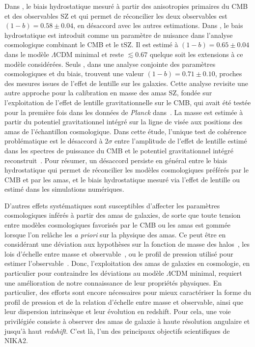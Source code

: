 Dans \citet{Planck_2016_SZ_cosmo}, le biais hydrostatique mesuré à partir
des anisotropies primaires du CMB et des observables SZ et qui permet
de réconcilier les deux observables est $(1-b) = 0.58 \pm 0.04$, en
désaccord avec les autres estimations. Dans \citet{Salvati2018}, le
bais hydrostatique est introduit comme un paramètre de nuisance dans
l'analyse cosmologique combinant le CMB et le tSZ. Il est estimé à
$(1-b) = 0.65 \pm 0.04$ dans le modèle $\Lambda$CDM minimal et reste
$\lesssim 0.67$ quelque soit les extensions à ce modèle considérées.
Seuls \citet{Zulbedia2019}, dans une analyse conjointe des paramètres
cosmologiques et du biais, trouvent une valeur
$(1-b) = 0.71 \pm 0.10$, proches des mesures issues de l'effet de
lentille sur les galaxies. Cette analyse revisite une autre approche
pour la calibration en masse des amas SZ, fondée sur l'exploitation de
l'effet de lentille gravitationnelle sur le CMB, qui avait été testée
pour la première fois dans les données de \emph{Planck}
dans~\citet{Melin2015, Planck_2016_SZ_cosmo}.
La masse est estimée à partir du potentiel gravitationnel intégré sur
la ligne de visée aux positions des amas de l'échantillon
cosmologique. Dans cette étude, l'unique test de cohérence
problématique est le désaccord à $2\sigma$ entre l'amplitude de
l'effet de lentille estimé dans les spectres de puissance du CMB et le
potentiel gravitationnel intégré
reconstruit~\citep{Planck_2018_cosmo}. Pour résumer, un désaccord
persiste en général entre le biais hydrostatique qui permet de
réconcilier les modèles cosmologiques préférés par le CMB et par les
amas, et le biais hydrostatique mesuré via l'effet de lentille ou
estimé dans les simulations numériques. 
 
D'autres effets systématiques sont susceptibles d'affecter les
paramètres cosmologiques inférés à partir des amas de galaxies, de
sorte que toute tension entre modèles
cosmologiques favorisés par le CMB ou les amas est gommée lorsque l'on
relâche les \emph{a priori} sur la physique des amas. Ce peut être en
considérant une déviation aux hypothèses sur la fonction de masse des
halos~\citep{Bocquet2016}, les lois d'échelle entre masse et
observable~\citep{Planck_2016_SZ_cosmo}, ou le profil de pression
utilisé pour estimer l'observable~\citep{Ruppin2019b}. Donc,
l'exploitation des amas de galaxies en cosmologie, en particulier pour
contraindre les déviations au modèle $\Lambda$CDM minimal, requiert
une amélioration de notre connaissance de leur propriétés
physiques. En particulier, des efforts sont encore nécessaires pour
mieux caractériser la forme du profil de pression et de la relation
d'échelle entre masse et observable, ainsi que leur dispersion
intrinsèque et leur évolution en redshift.  
Pour cela, une voie privilégiée consiste à observer des amas de
galaxie à haute résolution angulaire et jusqu'à haut \emph{redshift}. C'est
là, l'un des principaux objectifs scientifiques de NIKA2. 



